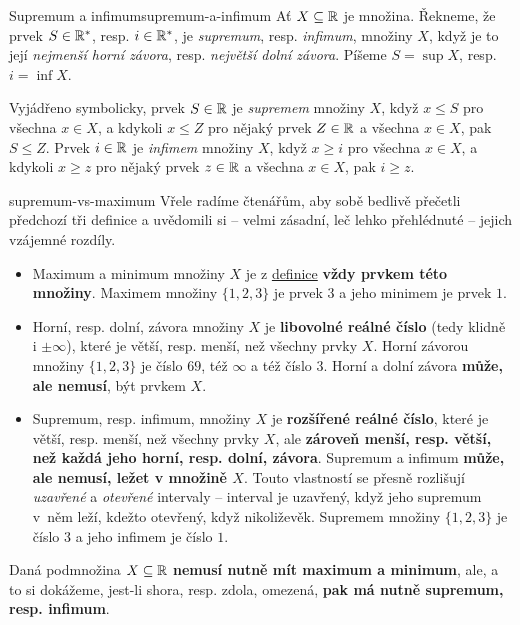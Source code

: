 \begin{definition}{Supremum a infimum}{supremum-a-infimum}
 Ať $X \subseteq \mathbb{R}$ je množina. Řekneme, že prvek $S \in \mathbb{R}^{*}$, resp. $i \in
 \mathbb{R}^{*}$, je \emph{supremum}, resp. \emph{infimum}, množiny $X$, když je to její
 \emph{nejmenší horní závora}, resp. \emph{největší dolní závora}. Píšeme $S =
 \sup X$, resp. $i = \inf X$.

 Vyjádřeno symbolicky, prvek $S \in \mathbb{R}$ je \emph{supremem} množiny $X$, když $x
 \leq S$ pro všechna $x \in X$, a kdykoli $x \leq Z$ pro nějaký prvek $Z \in \mathbb{R}$
 a všechna $x \in X$, pak $S \leq Z$. Prvek $i \in \mathbb{R}$ je \emph{infimem} množiny
 $X$, když $x \geq i$ pro všechna $x \in X$, a kdykoli $x \geq z$ pro nějaký
 prvek $z \in \mathbb{R}$ a všechna $x \in X$, pak $i \geq z$.
\end{definition}

\begin{warning}[topsep at break=0pt]{}{supremum-vs-maximum}
 Vřele radíme čtenářům, aby sobě bedlivě přečetli předchozí tři definice a
 uvědomili si -- velmi zásadní, leč lehko přehlédnuté -- jejich vzájemné
 rozdíly.
 \begin{itemize}
  \item Maximum a minimum množiny $X$ je z
   \hyperref[def:maximum-a-minimum]{definice} \textbf{vždy prvkem této množiny}.
   Maximem množiny $\{1,2,3\}$ je prvek $3$ a jeho minimem je prvek $1$.
  \item Horní, resp. dolní, závora množiny $X$ je \textbf{libovolné
    reálné číslo} (tedy klidně i $ \pm \infty$), které je větší,
   resp. menší, než všechny prvky $X$. Horní závorou množiny $\{1,2,3\}$ je
   číslo $69$, též $\infty$ a též číslo $3$. Horní a dolní závora \textbf{může,
   ale nemusí}, být prvkem $X$.
  \item Supremum, resp. infimum, množiny $X$ je \textbf{rozšířené reálné číslo},
   které je větší, resp. menší, než všechny prvky $X$, ale \textbf{zároveň
   menší, resp. větší, než každá jeho horní, resp. dolní, závora}. Supremum a
   infimum \textbf{může, ale nemusí, ležet v množině $X$}. Touto vlastností se
   přesně rozlišují \emph{uzavřené} a \emph{otevřené} intervaly -- interval je
   uzavřený, když jeho supremum v~něm leží, kdežto otevřený, když nikoliževěk.
   Supremem množiny $\{1,2,3\}$ je číslo $3$ a jeho infimem je číslo $1$.
 \end{itemize}
 Daná podmnožina $X \subseteq \mathbb{R}$ \textbf{nemusí nutně mít maximum a minimum},
 ale, a to si dokážeme, jest-li shora, resp. zdola, omezená, \textbf{pak má
 nutně supremum, resp. infimum}.
\end{warning}

